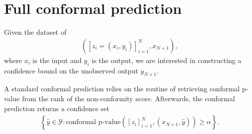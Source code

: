 \documentclass{article}
\newcommand{\oo}[1]{\left( #1 \right)}
\newcommand{\cc}[1]{\left[ #1 \right]}
\begin{document}

\printAffiliationsAndNotice{}



\begin{abstract}
    The theory of full conformal prediction uses deterministic non-conformity measure, but modern usage of full conformal prediction often relies on machine learning training, making stochasticity inevitable. A simple sufficient condition of almost sure permutation invariance of the non-conformity measure can be too restrictive, so many have suggested the relaxation to permutation in distribution as a condition for full conformal prediction validity. We, however, show that this commonly known condition is actually insufficient. We then provide a correct sufficient condition: \emph{Conditional Independence \& Permutation Invariance in Distribution}, which encompasses several stochastic settings that may be used in machine learning.
\end{abstract}

\section{Full conformal prediction}

    Given the dataset of 
    \begin{align*}
        \left(\cc{z_i=(x_i, y_i)}_{i=1}^N, x_{N+1}\right),
    \end{align*}
    where $x_i$ is the input and $y_i$ is the output, we are interested in constructing a confidence bound on the unobserved output $y_{N+1}$. 

    A standard conformal prediction relies on the routine of retrieving conformal p-value from the rank of the non-conformity score. Afterwards, the conformal prediction returns a  confidence set
    \begin{align*}
        \left\{\hat{y}\in \mathcal{Y}: \text{conformal p-value}\oo{\cc{z_i}_{i=1}^N, \oo{x_{N+1}, \hat{y}}} \ge \alpha\right\}.
    \end{align*}
    
\end{document}
